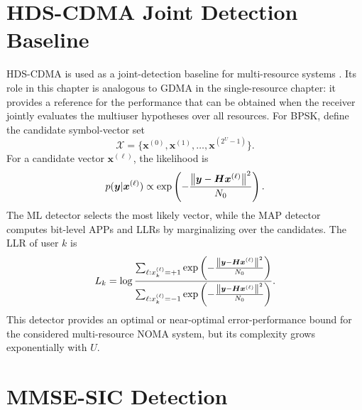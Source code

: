 \section{HDS-CDMA Joint Detection Baseline}

HDS-CDMA is used as a joint-detection baseline for multi-resource systems \cite{lin2023hds}. Its role in this chapter is analogous to GDMA in the single-resource chapter: it provides a reference for the performance that can be obtained when the receiver jointly evaluates the multiuser hypotheses over all resources. For BPSK, define the candidate symbol-vector set
\begin{equation}
    \mathcal{X}=\{\bm{x}^{(0)},\bm{x}^{(1)},\ldots,\bm{x}^{(2^U-1)}\}.
\end{equation}
For a candidate vector $\bm{x}^{(\ell)}$, the likelihood is
\begin{equation}
    p(\bm{y}|\bm{x}^{(\ell)})
    \propto
    \exp\left(-\frac{\left\lVert \bm{y}-\bm{H}\bm{x}^{(\ell)} \right\rVert^2}{N_0}\right).
\end{equation}
The ML detector selects the most likely vector, while the MAP detector computes bit-level APPs and LLRs by marginalizing over the candidates. The LLR of user $k$ is
\begin{equation}
    L_k =
    \log
    \frac{
    \sum_{\ell:x_k^{(\ell)}=+1}
    \exp\left(-\frac{\left\lVert \bm{y}-\bm{H}\bm{x}^{(\ell)} \right\rVert^2}{N_0}\right)}
    {\sum_{\ell:x_k^{(\ell)}=-1}
    \exp\left(-\frac{\left\lVert \bm{y}-\bm{H}\bm{x}^{(\ell)} \right\rVert^2}{N_0}\right)} .
    \label{eq:hds-llr}
\end{equation}
This detector provides an optimal or near-optimal error-performance bound for the considered multi-resource NOMA system, but its complexity grows exponentially with $U$.

\section{MMSE-SIC Detection}

